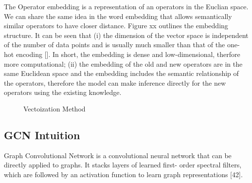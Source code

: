 The Operator embedding is a representation of an operators in the Euclian space. 
We can share the same idea in the word embedding that allows semantically similar operators to have closer distance. 
Figure xx outlines the embedding structure. 
It can be seen that (i) the dimension of the vector space is independent of the number of data points and is usually much smaller than that of the one-hot encoding []. 
In short, the embedding is dense and low-dimensional, therfore more computational; 
(ii) the embedding of the old and new operators are in the same Euclidean space and the embedding includes the semantic relationship of the operators, 
therefore the model can make inference directly for the new operators using the existing knowledge. 

\begin{figure}
    \caption{Vectoization Method}
    \label{fig:encoding}
\end{figure}


\subsection{GCN Intuition}
Graph Convolutional Network is a convolutional neural network that can be directly applied to graphs. 
It stacks layers of learned first- order spectral filters, which are followed by an activation function to learn graph representations [42].

